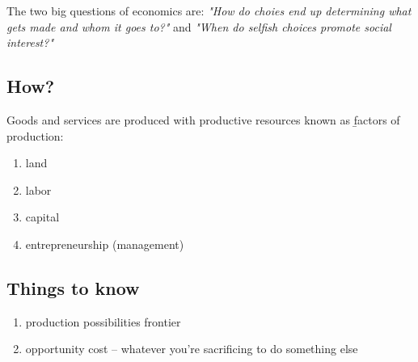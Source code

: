 \documentclass[12pt]{article}
\begin{document}
The two big questions of economics are:
\textit{"How do choies end up determining what gets made and whom it goes to?"} and
\textit{"When do selfish choices promote social interest?"}

\subsection{How?}
Goods and services are produced with productive resources known as \b{factors of production}:
\begin{enumerate}
    \item land
    \item labor
    \item capital
    \item entrepreneurship (management)
\end{enumerate}

\subsection{Things to know}
\begin{enumerate}
    \item production possibilities frontier
    \item opportunity cost -- whatever you're sacrificing to do something else
\end{enumerate}
\end{document}
